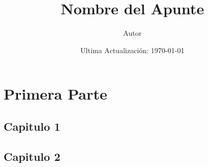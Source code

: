 \documentclass[10pt]{book}
\title{\huge Nombre del Apunte}
\author{Autor}
\date{Ultima Actualización: \today}
\begin{document}
	\maketitle
	
	\tableofcontents
	
	\part{Primera Parte}

		\chapter{Capitulo 1}
			

		\chapter{Capitulo 2}
			

	
	
	\listoffigures
	
	\lstlistoflistings
	
	
	
\end{document}
